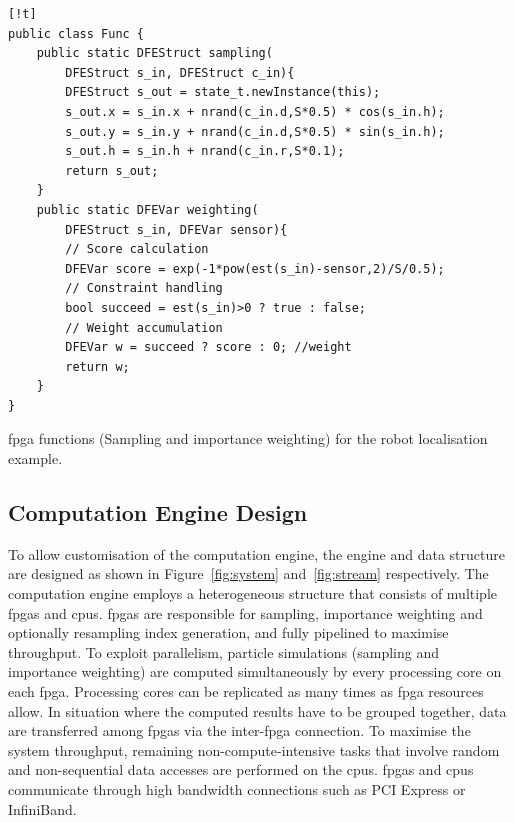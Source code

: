\begin{Code}
\centering
\lstset{language=Java,
        basicstyle=\ttfamily\small,
				tabsize=2,
				numbers=left,
				numberstyle=\tiny,
				frame=tb,
				columns=fullflexible,
				showstringspaces=false
				}
\begin{lstlisting}[][!t]
public class Func {
	public static DFEStruct sampling(
		DFEStruct s_in, DFEStruct c_in){
		DFEStruct s_out = state_t.newInstance(this);
		s_out.x = s_in.x + nrand(c_in.d,S*0.5) * cos(s_in.h);
		s_out.y = s_in.y + nrand(c_in.d,S*0.5) * sin(s_in.h);
		s_out.h = s_in.h + nrand(c_in.r,S*0.1);
		return s_out;
	}
	public static DFEVar weighting(
		DFEStruct s_in, DFEVar sensor){
		// Score calculation
		DFEVar score = exp(-1*pow(est(s_in)-sensor,2)/S/0.5);
		// Constraint handling
		bool succeed = est(s_in)>0 ? true : false;
		// Weight accumulation
		DFEVar w = succeed ? score : 0; //weight
		return w;
	}
}
\end{lstlisting}
\caption{\small \gls{fpga} functions (Sampling and importance weighting) for the robot localisation example.}
\label{lst:func}
\end{Code}


\subsection{Computation Engine Design}
\label{sec:system}

To allow customisation of the computation engine, the engine and data structure are designed as shown in Figure~\ref{fig:system} and~\ref{fig:stream} respectively.
The computation engine employs a heterogeneous structure that consists of multiple \gls{fpga}s and \gls{cpu}s.
\gls{fpga}s are responsible for sampling, importance weighting and optionally resampling index generation, and fully pipelined to maximise throughput. 
To exploit parallelism, particle simulations (sampling and importance weighting) are computed simultaneously by every processing core on each \gls{fpga}. 
Processing cores can be replicated as many times as \gls{fpga} resources allow.
In situation where the computed results have to be grouped together, data are transferred among \gls{fpga}s via the inter-\gls{fpga} connection.
To maximise the system throughput, remaining non-compute-intensive tasks that involve random and non-sequential data accesses are performed on the \gls{cpu}s.
\gls{fpga}s and \gls{cpu}s communicate through high bandwidth connections such as PCI Express or InfiniBand.

